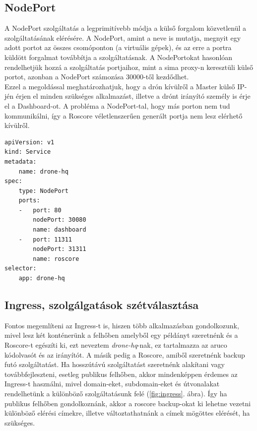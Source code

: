 \subsection{NodePort}
A NodePort szolgáltatás a legprimitívebb módja a külső forgalom közvetlenül a szolgáltatásának elérésére. A NodePort, amint a neve is mutatja, megnyit egy adott portot az összes csomóponton (a virtuális gépek), és az erre a portra küldött forgalmat továbbítja a szolgáltatásnak. \cite{nodeport} A NodePortokat hasonlóan rendelhetjük hozzá a szolgáltatás portjaihoz, mint a sima proxy-n keresztüli külső portot, azonban a NodePort számozása 30000-től kezdődhet. \\

\noindent
Ezzel a megoldással meghatározhatjuk, hogy a drón kívülről a Master külső IP-jén érjen el minden szükséges alkalmazást, illetve a drónt irányító személy is érje el a Dashboard-ot. A probléma a NodePort-tal, hogy más porton nem tud kommunikálni, így a Roscore véletlenszerűen generált portja nem lesz elérhető kívülről.

\begin{lstlisting}[caption={Service kiegészítése NodePort-okkal},label={lst:nodeport}]
apiVersion: v1
kind: Service
metadata:
	name: drone-hq
spec:
	type: NodePort
	ports:
	-	port: 80
		nodePort: 30080
		name: dashboard
	-	port: 11311
		nodePort: 31311
		name: roscore
selector:
	app: drone-hq
\end{lstlisting}

\subsection{Ingress, szolgálgatások szétválasztása}
Fontos megemlíteni az Ingress-t is, hiszen több alkalmazásban gondolkozunk, mivel lesz két konténerünk a felhőben amelyből egy példányt szeretnénk és a Roscore-t egészíti ki, ezt neveztem \emph{drone-hq}-nak, ez tartalmazza az aruco kódolvasót és az irányítót. A másik pedig a Roscore, amiből szeretnénk backup futó szolgáltatást. Ha hosszútávú szolgáltatást szeretnénk alakítani vagy továbbfejleszteni, esetleg publikus felhőben, akkor mindenképpen érdemes az Ingress-t használni, mivel domain-eket, subdomain-eket és útvonalakat rendelhetünk a különböző szolgáltatásunk felé (\ref{fig:ingress}. ábra). Így ha publikus felhőben gondolkoznánk, akkor a roscore backup-okat ki lehetne vezetni különböző elérési címekre, illetve változtathatnánk a címek mögöttes elérését, ha szükséges.

